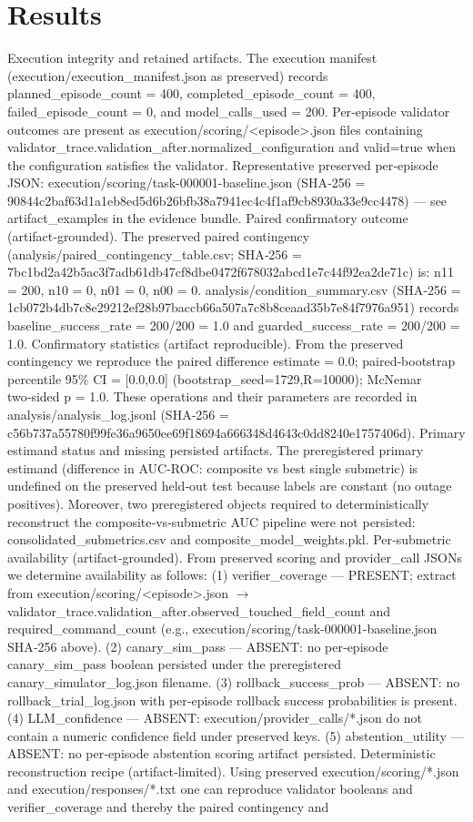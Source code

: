\documentclass[conference]{IEEEtran}
\begin{document}
\section{Results}
Execution integrity and retained artifacts. The execution manifest (execution/execution\_manifest.json as preserved) records planned\_episode\_count = 400, completed\_episode\_count = 400, failed\_episode\_count = 0, and model\_calls\_used = 200. Per‑episode validator outcomes are present as execution/scoring/<episode>.json files containing validator\_trace.validation\_after.normalized\_configuration and valid=true when the configuration satisfies the validator. Representative preserved per‑episode JSON: execution/scoring/task-000001-baseline.json (SHA‑256 = 90844c2baf63d1a1eb8ed5d6b26bfb38a7941ec4c4f1af9cb8930a33e9cc4478) --- see artifact\_examples in the evidence bundle. Paired confirmatory outcome (artifact‑grounded). The preserved paired contingency (analysis/paired\_contingency\_table.csv; SHA‑256 = 7bc1bd2a42b5ac3f7adb61db47cf8dbe0472f678032abcd1e7c44f92ea2de71c) is: n11 = 200, n10 = 0, n01 = 0, n00 = 0. analysis/condition\_summary.csv (SHA‑256 = 1cb072b4db7c8e29212ef28b97baccb66a507a7c8b8ceaad35b7e84f7976a951) records baseline\_success\_rate = 200/200 = 1.0 and guarded\_success\_rate = 200/200 = 1.0. Confirmatory statistics (artifact reproducible). From the preserved contingency we reproduce the paired difference estimate = 0.0; paired‑bootstrap percentile 95\% CI = [0.0,0.0] (bootstrap\_seed=1729,R=10000); McNemar two‑sided p = 1.0. These operations and their parameters are recorded in analysis/analysis\_log.jsonl (SHA‑256 = c56b737a55780f99fe36a9650ee69f18694a666348d4643c0dd8240e1757406d). Primary estimand status and missing persisted artifacts. The preregistered primary estimand (difference in AUC‑ROC: composite vs best single submetric) is undefined on the preserved held‑out test because labels are constant (no outage positives). Moreover, two preregistered objects required to deterministically reconstruct the composite‑vs‑submetric AUC pipeline were not persisted: consolidated\_submetrics.csv and composite\_model\_weights.pkl. Per‑submetric availability (artifact‑grounded). From preserved scoring and provider\_call JSONs we determine availability as follows: (1) verifier\_coverage --- PRESENT; extract from execution/scoring/<episode>.json \ensuremath{\rightarrow} validator\_trace.validation\_after.observed\_touched\_field\_count and required\_command\_count (e.g., execution/scoring/task-000001-baseline.json SHA‑256 above). (2) canary\_sim\_pass --- ABSENT: no per‑episode canary\_sim\_pass boolean persisted under the preregistered canary\_simulator\_log.json filename. (3) rollback\_success\_prob --- ABSENT: no rollback\_trial\_log.json with per‑episode rollback success probabilities is present. (4) LLM\_confidence --- ABSENT: execution/provider\_calls/*.json do not contain a numeric confidence field under preserved keys. (5) abstention\_utility --- ABSENT: no per‑episode abstention scoring artifact persisted. Deterministic reconstruction recipe (artifact‑limited). Using preserved execution/scoring/*.json and execution/responses/*.txt one can reproduce validator booleans and verifier\_coverage and thereby the paired contingency and 
\end{document}
